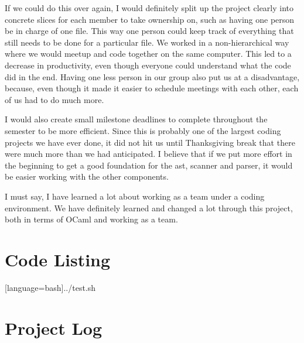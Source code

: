\documentclass[11pt]{report}
\begin{document}
If we could do this over again, I would definitely split up the project clearly into concrete slices for each member to take ownership on, such as having one person be in charge of one file. This way one person could keep track of everything that still needs to be done for a particular file. We worked in a non-hierarchical way where we would meetup and code together on the same computer. This led to a decrease in productivity, even though everyone could understand what the code did in the end. Having one less person in our group also put us at a disadvantage, because, even though it made it easier to schedule meetings with each other, each of us had to do much more.

I would also create small milestone deadlines to complete throughout the semester to be more efficient. Since this is probably one of the largest coding projects we have ever done, it did not hit us until Thanksgiving break that there were much more than we had anticipated. I believe that if we put more effort in the beginning to get a good foundation for the ast, scanner and parser, it would be easier working with the other components.

I must say, I have learned a lot about working as a team under a coding environment. We have definitely learned and changed a lot through this project, both in terms of OCaml and working as a team.

\appendix
\chapter{Code Listing}






[language=bash]{../test.sh}

\chapter{Project Log}

\end{document}
